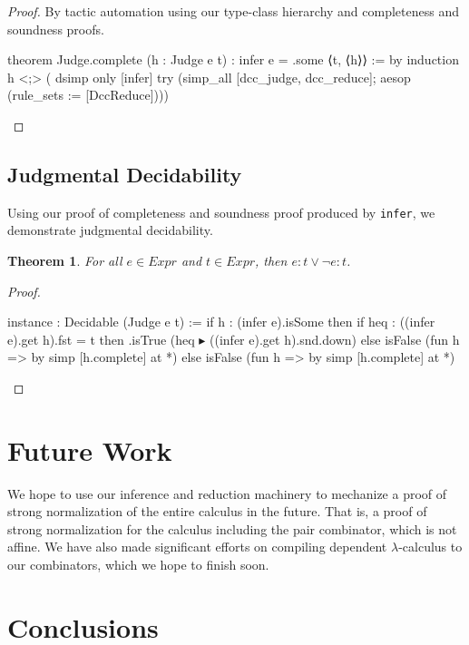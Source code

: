 \documentclass{article}
\newtheorem{theorem}{Theorem}
\begin{document}
\begin{proof}
  By tactic automation using our type-class hierarchy and completeness and soundness proofs.
\begin{leancode}
theorem Judge.complete (h : Judge e t) : infer e = .some ⟨t, ⟨h⟩⟩ := by
  induction h <;> (
    dsimp only [infer]
    try (simp_all [dcc_judge, dcc_reduce]; aesop (rule_sets := [DccReduce])))
\end{leancode}
\end{proof}

\subsection{Judgmental Decidability}

Using our proof of completeness and soundness proof produced by \texttt{infer}, we demonstrate judgmental decidability.

\begin{theorem}
  For all \(e \in Expr\) and \(t \in Expr\), then \(e : t \lor \neg e : t\).
\end{theorem}

\begin{proof}
\begin{leancode}


instance : Decidable (Judge e t) :=
  if h : (infer e).isSome then
    if heq : ((infer e).get h).fst = t then
      .isTrue (heq ▸ ((infer e).get h).snd.down)
    else
      isFalse (fun h => by simp [h.complete] at *)
  else
    isFalse (fun h => by simp [h.complete] at *)
\end{leancode}
\end{proof}


\section{Future Work}

We hope to use our inference and reduction machinery to mechanize a proof of strong normalization of the entire calculus in the future. That is, a proof of strong normalization for the calculus including the pair combinator, which is not affine. We have also made significant efforts on compiling dependent \(\lambda\)-calculus to our combinators, which we hope to finish soon.

\section{Conclusions}
\end{document}
